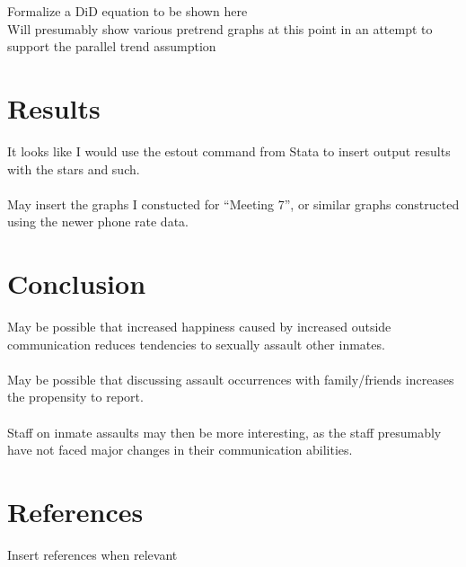 \documentclass[10pt,a4paper]{article}
\begin{document}
\noindent Formalize a DiD equation to be shown here \\

\noindent Will presumably show various pretrend graphs at this point in an attempt to support the parallel trend assumption \\





\section{Results}
It looks like I would use the estout command from Stata to insert output results with the stars and such. \\
\\

May insert the graphs I constucted for ``Meeting 7'', or similar graphs constructed using the newer phone rate data. \\





\section{Conclusion}
May be possible that increased happiness caused by increased outside communication reduces tendencies to sexually assault other inmates. \\
\\

May be possible that discussing assault occurrences with family/friends increases the propensity to report. \\
\\

Staff on inmate assaults may then be more interesting, as the staff presumably have not faced major changes in their communication abilities. \\





\section{References}
Insert references when relevant\\
\end{document}
